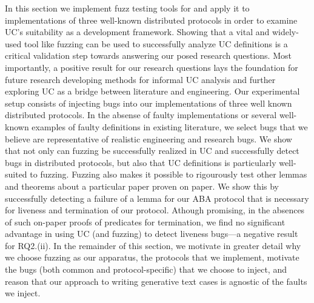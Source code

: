 In this section we implement fuzz testing tools for \us and apply it to implementations of three well-known distributed protocols in order to examine UC's suitability as a development framework.
Showing that a vital and widely-used tool like fuzzing can be used to successfully analyze UC definitions is a critical validation step towards answering our posed research questions. 
Most importantly, a positive result for our research questions lays the foundation for future research developing methods for informal UC analysis and further exploring UC as a bridge between literature and engineering.
Our experimental setup consists of injecting bugs into our implementations of three well known distributed protocols.
In the absense of faulty implementations or several well-known examples of faulty definitions in existing literature, we select bugs that we believe are representative of realistic engineering and research bugs. 
We show that not only can fuzzing be successfully realized in UC and successfully detect bugs in distributed protocols, but also that UC definitions is particularly well-suited to fuzzing. 
Fuzzing also makes it possible to rigourously test other lemmas and theorems about a particular paper proven on paper. 
We show this by successfully detecting a failure of a lemma for our ABA protocol that is necessary for liveness and termination of our protocol.
Athough promising, in the absences of such on-paper proofs of predicates for termination, we find no significant advantage in using UC (and fuzzing) to detect liveness bugs---a negative result for RQ2.(ii).
In the remainder of this section, we motivate in greater detail why we choose fuzzing as our apparatus, the protocols that we implement, motivate the bugs (both common and protocol-specific) that we choose to inject, and reason that our approach to writing generative text cases is agnostic of the faults we inject.~ 


